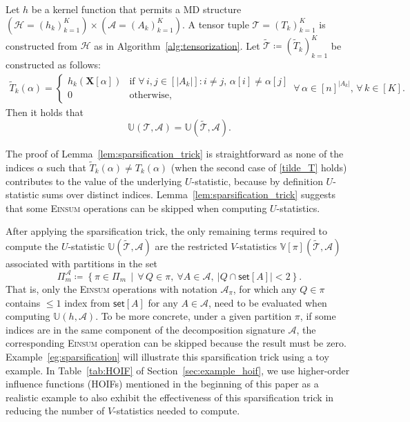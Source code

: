 \documentclass[twoside,11pt]{article}
\def\tilde{\widetilde}
\def\Einsum{\textsc{Einsum}}
\def\tilde{\widetilde}
\newcommand{\ustat}{\mathbb{U}}
\newcommand{\vstat}{\mathbb{V}}
\newcommand{\takesetp}[1]{\mathsf{set}[#1]}
\newcommand{\partition}{\Pi}
\newcommand{\partitionp}[1]{\partition_{#1}}
\def\calA{\mathcal{A}}
\def\calT{\mathcal{T}}
\def\calH{\mathcal{H}}
\begin{document}
\begin{lemma}\label{lem:sparsification_trick}
Let $h$ be a kernel function that permits a MD structure $(\calH = (h_k)_{k=1}^K) \times (\calA = (A_k)_{k=1}^K)$. A tensor tuple $\calT = (T_k)_{k = 1}^{K}$ is constructed from $\calH$ as in Algorithm~\ref{alg:tensorization}. Let $\tilde{\calT} \coloneqq (\tilde{T}_k)_{k=1}^K$ be constructed as follows:
\begin{equation}
\label{tilde_T}
\begin{split}
\tilde{T}_k (\alpha) = 
\begin{cases}
h_k (\bm{X}[\alpha]) & \text{if } \forall \, i,j \in [|A_k|]: i \neq j, \, \alpha [i] \neq \alpha [j] \\
0 & \text{otherwise}, 
\end{cases}
\, \forall \, \alpha \in [n]^{|A_k|}, \, \forall \, k \in [K]. 
\end{split}
\end{equation}
Then it holds that
\begin{equation*}
\ustat(\calT, \calA) = \ustat(\tilde{\calT}, \calA).   
\end{equation*}
\end{lemma}

The proof of Lemma~\ref{lem:sparsification_trick} is straightforward as none of the indices $\alpha$ such that $\tilde{T}_{k} (\alpha) \neq T_{k} (\alpha)$ (when the second case of \eqref{tilde_T} holds) contributes to the value of the underlying $U$-statistic, because by definition $U$-statistic sums over distinct indices. Lemma~\ref{lem:sparsification_trick} suggests that some \Einsum{} operations can be skipped when computing $U$-statistics.

\begin{remark}\label{rem:sparsification_terms_revised}
After applying the sparsification trick, the only remaining terms required to compute the $U$-statistic $\ustat(\widetilde{\calT}, \calA)$ are the restricted $V$-statistics $\vstat[\pi](\widetilde{\calT}, \calA)$ associated with partitions in the set
\begin{equation}
\label{eq:quotient_set}
\partition_m^\calA \coloneqq \left\{ \pi \in \partitionp{m} \,\middle|\, \forall \, Q \in \pi,\ \forall A \in \calA,\ |Q \cap \takesetp{A}| < 2 \right\}.
\end{equation}
That is, only the \Einsum{} operations with notation $\calA_\pi$, for which any $Q \in \pi$ contains $\leq 1$ index from $\takesetp{A}$ for any $A \in \calA$, need to be evaluated when computing $\ustat(h, \calA)$.  To be more concrete, under a given partition $\pi$, if some indices are in the same component of the decomposition signature $\calA$, the corresponding \Einsum{} operation can be skipped because the result must be zero. Example~\ref{eg:sparsification} will illustrate this sparsification trick using a toy example. In Table~\ref{tab:HOIF} of Section~\ref{sec:example_hoif}, we use higher-order influence functions (HOIFs) mentioned in the beginning of this paper as a realistic example to also exhibit the effectiveness of this sparsification trick in reducing the number of $V$-statistics needed to compute.
\end{remark}
\end{document}

